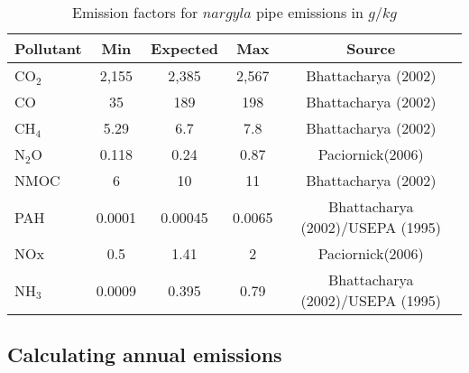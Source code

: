 \begin{table}[H]
\centering
\caption{Emission factors for $nargyla$ pipe emissions in $g/kg$}
\label{tb2:emissionfactors}
\begin{tabular}{@{}lcccc@{}}
\toprule
\textbf{Pollutant} & \textbf{Min} & \textbf{Expected} & \textbf{Max} & \textbf{Source} \\ \midrule
CO$_{2}$ & 2,155 & 2,385 & 2,567 & Bhattacharya (2002) \\
CO & 35 & 189 & 198 & Bhattacharya (2002) \\
CH$_{4}$ & 5.29 & 6.7 & 7.8 & Bhattacharya (2002) \\
N$_{2}$O & 0.118 & 0.24 & 0.87 & Paciornick(2006) \\
NMOC & 6 & 10 & 11 & Bhattacharya (2002) \\
PAH & 0.0001 & 0.00045 & 0.0065 & Bhattacharya (2002)/USEPA (1995) \\
NOx & 0.5 & 1.41 & 2 & Paciornick(2006) \\
NH$_{3}$ & 0.0009 & 0.395 & 0.79 & Bhattacharya (2002)/USEPA (1995) \\ \bottomrule
\end{tabular}
\end{table}


\subsection{Calculating annual emissions}

